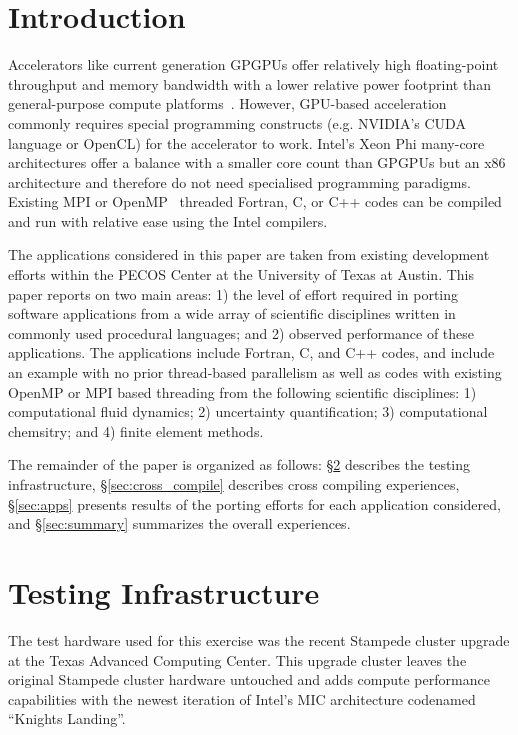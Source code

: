 \section{Introduction}
\label{sec:intro}

Accelerators like current generation GPGPUs offer relatively high
floating-point throughput and memory bandwidth with a lower relative power
footprint than general-purpose compute platforms~\cite{gpu_hpc:2009}. However,
GPU-based acceleration commonly requires special programming constructs (e.g.
NVIDIA's CUDA language\cite{} or OpenCL\cite{}) for the accelerator to work.
Intel's Xeon Phi many-core architectures offer a balance with a smaller core count than GPGPUs
but an x86 architecture and therefore do not need specialised programming
paradigms.  Existing MPI or OpenMP~\cite{openmp_standard} threaded Fortran, C,
or C++ codes can be compiled and run with relative ease using the Intel compilers.

The applications considered in this paper are taken from existing development
efforts within the PECOS Center\cite{} at the University of Texas at Austin.  This
paper reports on two main areas: 1) the level of effort required in porting
software applications from a wide array of scientific disciplines written in
commonly used procedural languages; and 2) observed performance of these
applications.  The applications include Fortran, C, and C++ codes, and include
an example with no prior thread-based parallelism as well as codes with
existing OpenMP or MPI based threading from the following scientific
disciplines: 1) computational fluid dynamics; 2) uncertainty quantification;
3) computational chemsitry; and 4) finite element methods.

The remainder of the paper is organized as follows: \S\ref{sec:hardware}
describes the testing infrastructure, \S\ref{sec:cross_compile} describes cross
compiling experiences, \S\ref{sec:apps} presents results of the porting efforts
for each application considered, and \S\ref{sec:summary} summarizes the overall
experiences.

\section{Testing Infrastructure}
\label{sec:hardware}

The test hardware used for this exercise was the recent Stampede cluster
upgrade at the Texas Advanced Computing Center.  This upgrade cluster leaves
the original Stampede cluster hardware untouched and adds compute performance
capabilities with the newest iteration of Intel's MIC architecture codenamed
``Knights Landing''.

